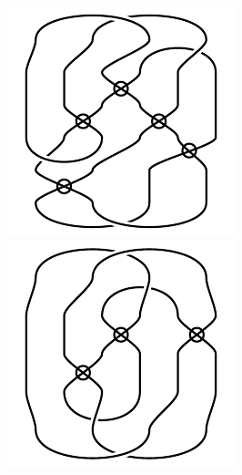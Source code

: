 \begin{figure}[H]
\begin{minipage}[b]{.18\linewidth}
\end{minipage}
\begin{minipage}[b]{.18\linewidth}
\centering
\includegraphics[width=\linewidth]{../data/virtual_4_49.png}
\end{minipage}
\begin{minipage}[b]{.18\linewidth}
\centering
\includegraphics[width=\linewidth]{../data/virtual_4_50.png}

\end{minipage}
\end{figure}
